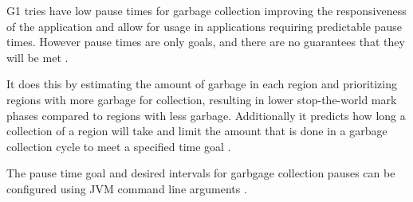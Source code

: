 G1 tries have low pause times for garbage collection improving the
responsiveness of the application and allow for usage in applications
requiring predictable pause times. However pause times are only goals,
and there are no guarantees that they will be met
\cite[3.2 Satisfying a Soft Real-Time Goal]{java_g1_2004}.

It does this by estimating the amount of garbage in each region and
prioritizing regions with more garbage for collection, resulting in lower stop-the-world mark phases
compared to regions with less garbage. %
Additionally it predicts how long a collection of a region will take and
limit the amount that is done in a garbage collection cycle to meet a
specified time goal \cite[3.2.1 Predicting Evacuation Pause Times]{java_g1_2004}.

The pause time goal and desired intervals for garbgage collection pauses can be configured using
JVM command line arguments \cite[Ergonomic Defaults for G1 GC]{java_g1_getting_started}.

